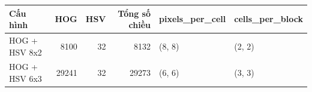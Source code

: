 \begin{tabular}{lrrrll}
\toprule
Cấu hình & HOG & HSV & Tổng số chiều & pixels_per_cell & cells_per_block \\
\midrule
HOG + HSV 8x2 & 8100 & 32 & 8132 & (8, 8) & (2, 2) \\
HOG + HSV 6x3 & 29241 & 32 & 29273 & (6, 6) & (3, 3) \\
\bottomrule
\end{tabular}
